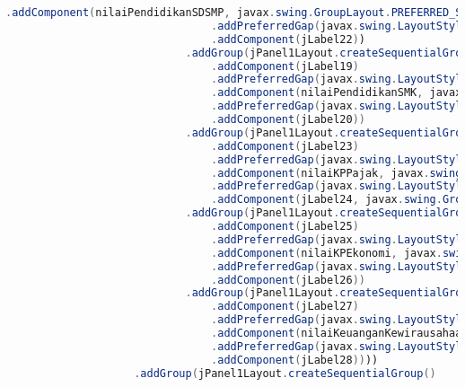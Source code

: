 \begin{lstlisting}[language=Java, caption=TampilanKondisiEksternal.java]
                                .addComponent(nilaiPendidikanSDSMP, javax.swing.GroupLayout.PREFERRED_SIZE, 41, javax.swing.GroupLayout.PREFERRED_SIZE)
                                .addPreferredGap(javax.swing.LayoutStyle.ComponentPlacement.RELATED)
                                .addComponent(jLabel22))
                            .addGroup(jPanel1Layout.createSequentialGroup()
                                .addComponent(jLabel19)
                                .addPreferredGap(javax.swing.LayoutStyle.ComponentPlacement.RELATED)
                                .addComponent(nilaiPendidikanSMK, javax.swing.GroupLayout.PREFERRED_SIZE, 41, javax.swing.GroupLayout.PREFERRED_SIZE)
                                .addPreferredGap(javax.swing.LayoutStyle.ComponentPlacement.UNRELATED)
                                .addComponent(jLabel20))
                            .addGroup(jPanel1Layout.createSequentialGroup()
                                .addComponent(jLabel23)
                                .addPreferredGap(javax.swing.LayoutStyle.ComponentPlacement.RELATED)
                                .addComponent(nilaiKPPajak, javax.swing.GroupLayout.PREFERRED_SIZE, 46, javax.swing.GroupLayout.PREFERRED_SIZE)
                                .addPreferredGap(javax.swing.LayoutStyle.ComponentPlacement.RELATED)
                                .addComponent(jLabel24, javax.swing.GroupLayout.PREFERRED_SIZE, 17, javax.swing.GroupLayout.PREFERRED_SIZE))
                            .addGroup(jPanel1Layout.createSequentialGroup()
                                .addComponent(jLabel25)
                                .addPreferredGap(javax.swing.LayoutStyle.ComponentPlacement.RELATED)
                                .addComponent(nilaiKPEkonomi, javax.swing.GroupLayout.PREFERRED_SIZE, 47, javax.swing.GroupLayout.PREFERRED_SIZE)
                                .addPreferredGap(javax.swing.LayoutStyle.ComponentPlacement.RELATED)
                                .addComponent(jLabel26))
                            .addGroup(jPanel1Layout.createSequentialGroup()
                                .addComponent(jLabel27)
                                .addPreferredGap(javax.swing.LayoutStyle.ComponentPlacement.UNRELATED)
                                .addComponent(nilaiKeuanganKewirausahaan, javax.swing.GroupLayout.PREFERRED_SIZE, 42, javax.swing.GroupLayout.PREFERRED_SIZE)
                                .addPreferredGap(javax.swing.LayoutStyle.ComponentPlacement.RELATED)
                                .addComponent(jLabel28))))
                    .addGroup(jPanel1Layout.createSequentialGroup()

\end{lstlisting}
